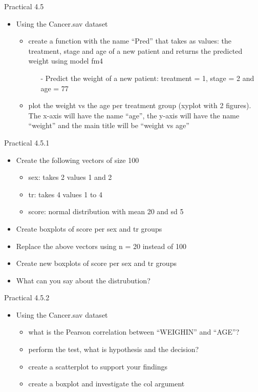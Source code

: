 \documentclass[14pt, aspectratio=169, sectionpage=simple, xclolor=table]{beamer}
\begin{document}
\begin{frame}{Practical 4.5}
\begin{itemize}
\item Using the Cancer.sav dataset
\begin{itemize}
\item create a function with the name \enquote{Pred} that takes as values: the treatment, stage and age of a new patient and returns the predicted weight using model fm4
\begin{itemize}
\item[-] Predict the weight of a new patient: treatment = 1, stage = 2 and age = 77
\end{itemize}
\item plot the weight vs the age per treatment group (xyplot with 2 figures). The x-axis will have the name \enquote{age}, the y-axis will have the name \enquote{weight} and the main title will be \enquote{weight vs age}
\end{itemize}
\end{itemize}
\end{frame}
\begin{frame}{Practical 4.5.1 }
\begin{itemize}
\item Create the following vectors of size 100
\begin{itemize}
\item sex: takes 2 values 1 and 2
\item tr: takes 4 values 1 to 4
\item score: normal distribution with mean 20 and sd 5
\end{itemize}
\item Create boxplots of score per sex and tr groups
\item Replace the above vectors using n = 20 instead of 100
\item Create new boxplots of score per sex and tr groups
\item What can you say about the distrubution?
\end{itemize}
\end{frame}
\begin{frame}{Practical 4.5.2 }
\begin{itemize}
\item Using the Cancer.sav dataset
\begin{itemize}
\item what is the Pearson correlation between \enquote{WEIGHIN} and \enquote{AGE}?
\item perform the test, what is hypothesis and the decision?
\item create a scatterplot to support your findings
\item create a boxplot and investigate the col argument
\end{itemize}
\end{itemize}
\end{frame}
\end{document}
